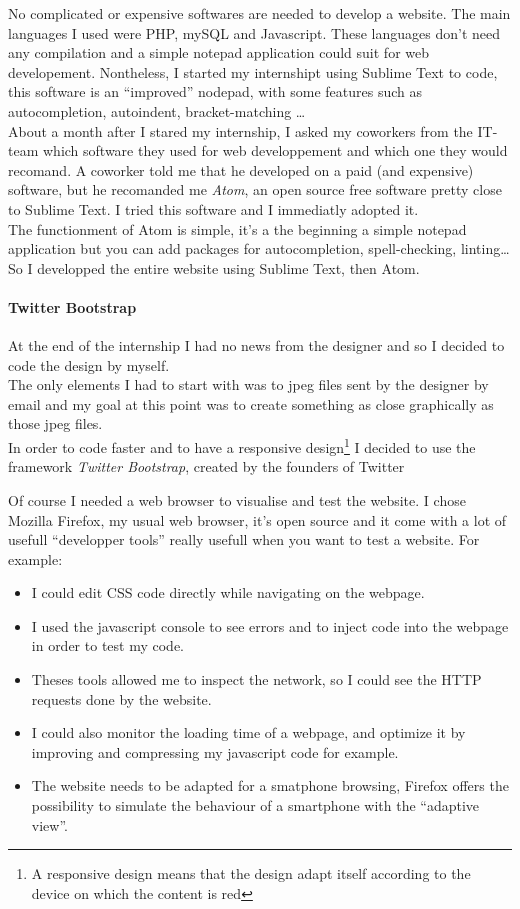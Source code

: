 \documentclass[10pt,a4paper]{article}
\begin{document}
No complicated or expensive softwares are needed to develop a website. The main languages I used were PHP, mySQL and Javascript. These languages don't need any compilation and a simple notepad application could suit for web developement. Nontheless, I started my internshipt using Sublime Text to code, this software is an ``improved'' nodepad, with some features such as autocompletion, autoindent, bracket-matching \ldots \\
About a month after I stared my internship, I asked my coworkers from the IT-team which software they used for web developpement and which one they would recomand. A coworker told me that he developed on a paid (and expensive) software, but he recomanded me \textit{Atom}, an open source free software pretty close to Sublime Text. I tried this software and I immediatly adopted it.\\
The functionment of Atom is simple, it's a the beginning a simple notepad application but you can add packages for autocompletion, spell-checking, linting\ldots \\
So I developped the entire website using Sublime Text, then Atom.

\paragraph{Twitter Bootstrap}
At the end of the internship I had no news from the designer and so I decided to code the design by myself.\\
The only elements I had to start with was to jpeg files sent by the designer by email and my goal at this point was to create something as close graphically as those jpeg files.\\
In order to code faster and to have a responsive design\footnote{A responsive design means that the design adapt itself according to the device on which the content is red} I decided to use the framework \textit{Twitter Bootstrap}, created by the founders of Twitter

Of course I needed a web browser to visualise and test the website. I chose Mozilla Firefox, my usual web browser, it's open source and it come with a lot of usefull ``developper tools'' really usefull when you want to test a website. For example:
\begin{itemize}
\item I could edit CSS code directly while navigating on the webpage.
\item I used the javascript console to see errors and to inject code into the webpage in order to test my code.
\item Theses tools allowed me to inspect the network, so I could see the HTTP requests done by the website.
\item I could also monitor the loading time of a webpage, and optimize it by improving and compressing my javascript code for example.
\item The website needs to be adapted for a smatphone browsing, Firefox offers the possibility to simulate the behaviour of a smartphone with the ``adaptive view''.
\end{itemize}
\end{document}
